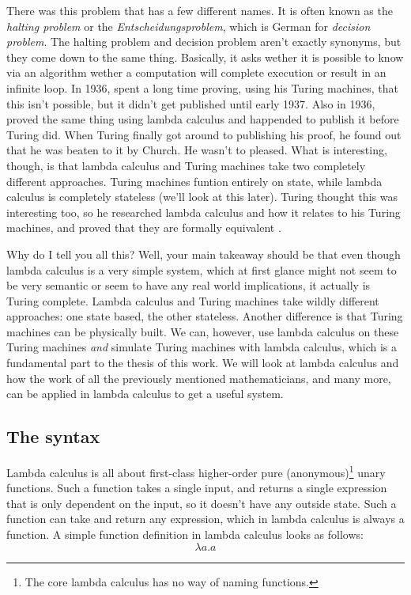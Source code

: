 \documentclass[11pt]{article}
\begin{document}
There was this problem that has a few different names. It is often known as the
\emph{halting problem} or the \emph{Entscheidungsproblem}, which is German for
\emph{decision problem}. The halting problem and decision problem aren't
exactly synonyms, but they come down to the same thing. Basically, it asks
wether it is possible to know via an algorithm wether a computation will
complete execution or result in an infinite loop. In 1936,
\textcite{turing1936, turing1937correction} spent a long time proving, using
his Turing machines, that this isn't possible, but it didn't get published
until early 1937. Also in 1936, \textcite{church1936} proved the same thing
using lambda calculus and happended to publish it before Turing did. When
Turing finally got around to publishing his proof, he found out that he was
beaten to it by Church. He wasn't to pleased. What is interesting, though, is
that lambda calculus and Turing machines take two completely different
approaches. Turing machines funtion entirely on state, while lambda calculus is
completely stateless (we'll look at this later). Turing thought this was
interesting too, so he researched lambda calculus and how it relates to his
Turing machines, and proved that they are formally equivalent
\parencite{turing1937computability}. 

Why do I tell you all this? Well, your main takeaway should be that even though
lambda calculus is a very simple system, which at first glance might not seem
to be very semantic or seem to have any real world implications, it actually is
Turing complete. Lambda calculus and Turing machines take wildly different
approaches: one state based, the other stateless. Another difference is that
Turing machines can be physically built. We can, however, use lambda calculus
on these Turing machines \emph{and} simulate Turing machines with lambda
calculus, which is a fundamental part to the thesis of this work. We will look
at lambda calculus and how the work of all the previously mentioned
mathematicians, and many more, can be applied in lambda calculus to get a
useful system.

\subsection{The syntax}\label{syntax}

Lambda calculus is all about first-class higher-order pure
(anonymous)\footnote{The core lambda calculus has no way of naming functions.}
unary functions. Such a function takes a single input, and returns a single
expression that is only dependent on the input, so it doesn't have any outside
state. Such a function can take and return any expression, which in lambda
calculus is always a function. A simple function definition in lambda calculus
looks as follows: \[\lambda a.a\]
\end{document}
